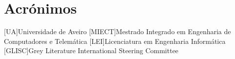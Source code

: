 \documentclass{report}
\begin{document}
\chapter*{Acrónimos}
\begin{acronym}
[UA]{Universidade de Aveiro}
[MIECT]{Mestrado Integrado em Engenharia de Computadores e Telemática}
[LEI]{Licenciatura em Engenharia Informática}
[GLISC]{Grey Literature International Steering Committee}
\end{acronym}


\printbibliography
\end{document}
